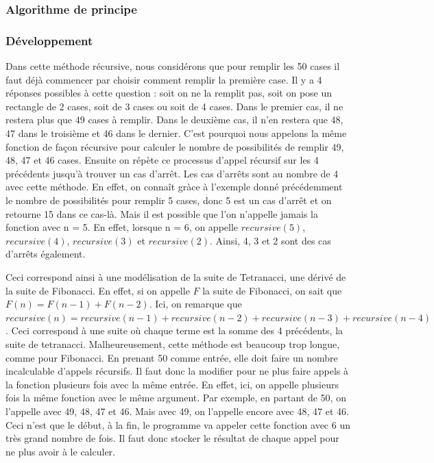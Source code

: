 \documentclass{article}
\begin{document}
\subsubsection{Algorithme de principe}


\subsubsection{Développement}
Dans cette méthode récursive, nous considérons que pour remplir les 50 cases il faut déjà commencer par choisir comment remplir la première case. Il y a 4 réponses possibles à cette question : soit on ne la remplit pas, soit on pose un rectangle de 2 cases, soit de 3 cases ou soit de 4 cases. Dans le premier cas, il ne restera plus que 49 cases à remplir. Dans le deuxième cas, il n'en restera que 48, 47 dans le troisième et 46 dans le dernier. C'est pourquoi nous appelons la même fonction de façon récursive pour calculer le nombre de possibilités de remplir 49, 48, 47 et 46 cases. Ensuite on répète ce processus d'appel récursif sur les 4 précédents jusqu'à trouver un cas d'arrêt. Les cas d'arrêts sont au nombre de 4 avec cette méthode. En effet, on connaît gràce à l'exemple donné précédemment le nombre de possibilités pour remplir 5 cases, donc 5 est un cas d'arrêt et on retourne 15 dans ce cas-là. Mais il est possible que l'on n'appelle jamais la fonction avec n = 5. En effet, lorsque n = 6, on appelle $recursive(5)$, $recursive(4)$, $recursive(3)$ et $recursive(2)$. Ainsi, 4, 3 et 2 sont des cas d'arrêts également.

Ceci correspond ainsi à une modélisation de la suite de Tetranacci, une dérivé de la suite de Fibonacci. En effet, si on appelle $F$ la suite de Fibonacci, on sait que $F(n) = F(n-1) + F(n-2)$. Ici, on remarque que $recursive(n) = recursive(n-1) + recursive(n-2) + recursive(n-3) + recursive(n-4)$. Ceci correspond à une suite où chaque terme est la somme des 4 précédents, la suite de tetranacci. Malheureusement, cette méthode est beaucoup trop longue, comme pour Fibonacci. En prenant 50 comme entrée, elle doit faire un nombre incalculable d'appels récursifs. Il faut donc la modifier pour ne plus faire appels à la fonction plusieurs fois avec la même entrée. En effet, ici, on appelle plusieurs fois la même fonction avec le même argument. Par exemple, en partant de 50, on l'appelle avec 49, 48, 47 et 46. Mais avec 49, on l'appelle encore avec 48, 47 et 46. Ceci n'est que le début, à la fin, le programme va appeler cette fonction avec 6 un très grand nombre de fois. Il faut donc stocker le résultat de chaque appel pour ne plus avoir à le calculer.
\end{document}
